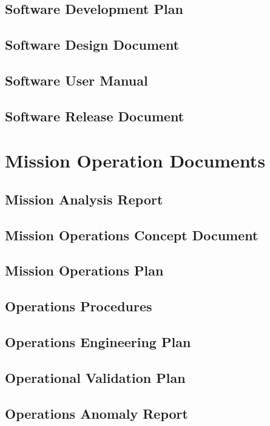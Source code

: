 \subsection{Software Development Plan}
\label{sec:Software Development Plan}


\subsection{Software Design Document}
\label{sec:Software Design Document}


\subsection{Software User Manual}
\label{sec:Software User Manual}


\subsection{Software Release Document}
\label{sec:Software Release Document}

\clearpage
\section{Mission Operation Documents}


\subsection{Mission Analysis Report}
\label{sec:Mission Analysis Report}


\subsection{Mission Operations Concept Document}
\label{sec:Mission Operations Concept Document}


\subsection{Mission Operations Plan}
\label{sec:Mission Operations Plan}


\subsection{Operations Procedures}
\label{sec:Operations Procedures}


\subsection{Operations Engineering Plan}
\label{sec:Operations Engineering Plan}


\subsection{Operational Validation Plan}
\label{sec:Operational Validation Plan}


\subsection{Operations Anomaly Report}
\label{sec:Operations Anomaly Report}
